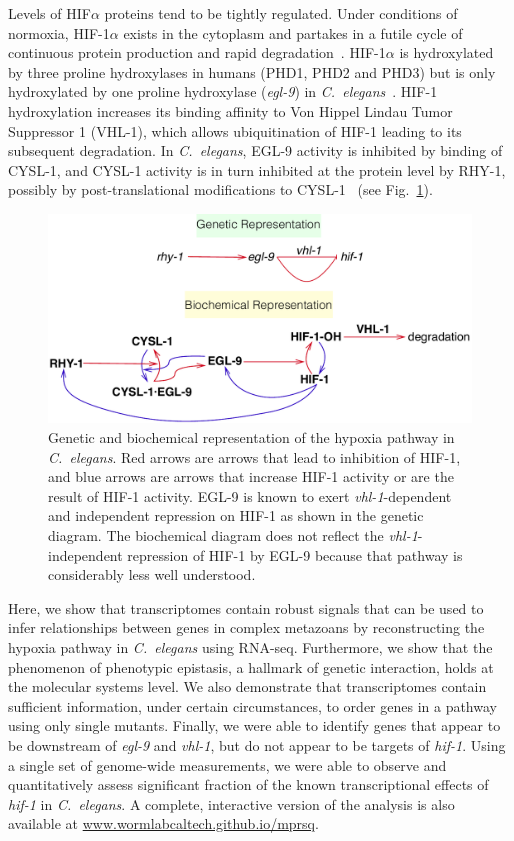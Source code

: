 \documentclass[9pt,twocolumn,twoside]{pnas-new}
\newcommand{\cel}{\emph{C.~elegans}}
\newcommand{\gene}[1]{\emph{#1}}
\newcommand{\eglp}{EGL-9}
\newcommand{\rhyp}{RHY-1}
\newcommand{\vhlp}{VHL-1}
\newcommand{\hifp}{HIF-1}
\newcommand{\cyslp}{CYSL-1}
\begin{document}
Levels of HIF$\alpha$ proteins tend to be tightly regulated. Under conditions of
normoxia, \hifp{}$\alpha$ exists in the cytoplasm and partakes in a futile cycle
of continuous protein production and rapid degradation~\cite{Huang1996}.
\hifp{}$\alpha$ is hydroxylated by three proline hydroxylases
in humans (PHD1, PHD2 and PHD3) but is only hydroxylated by one proline
hydroxylase (\gene{egl-9}) in \cel{}~\cite{Kaelin2008}. \hifp{} hydroxylation
increases its binding affinity to Von Hippel Lindau Tumor Suppressor 1
(\vhlp{}), which allows ubiquitination of \hifp{} leading to its subsequent
degradation. In \cel{}, \eglp{} activity is inhibited by binding of \cyslp{},
and \cyslp{} activity is in turn inhibited at the protein level by \rhyp{},
possibly by post-translational modifications to \cyslp{}~\cite{Ma2012} (see
Fig.~\ref{fig:pathway}).

\begin{figure}[tbhp]
\centering
\includegraphics[width=\linewidth]{figs/HIF1pathway.pdf}
\caption{
Genetic and biochemical representation of the hypoxia pathway in \cel{}.
Red arrows are arrows that lead to inhibition of \hifp{}, and blue arrows
are arrows that increase \hifp{} activity or are the result of \hifp{} activity.
\eglp{} is known to exert \gene{vhl-1}-dependent and independent repression
on \hifp{} as shown in the genetic diagram. The biochemical diagram does not
reflect the \gene{vhl-1}-independent repression of \hifp{} by \eglp{} because
that pathway is considerably less well understood.
}
\label{fig:pathway}
\end{figure}

Here, we show that transcriptomes contain robust signals that can be
used to infer relationships between genes in complex metazoans by reconstructing
the hypoxia pathway in \cel{} using RNA-seq.
Furthermore, we show that the phenomenon of phenotypic epistasis, a hallmark of
genetic interaction, holds at the molecular systems level.
We also demonstrate that transcriptomes contain sufficient information, under
certain circumstances, to order genes in a pathway using only single mutants.
Finally, we were able to identify genes that appear to be downstream of \gene{egl-9}
and \gene{vhl-1}, but do not appear to be targets of \gene{hif-1}.
Using a single set of genome-wide measurements, we were able to observe and
quantitatively assess  significant fraction of the known transcriptional
effects of \gene{hif-1} in \cel{}.
A complete, interactive version of the analysis is also available at
\url{www.wormlabcaltech.github.io/mprsq}.
\end{document}

